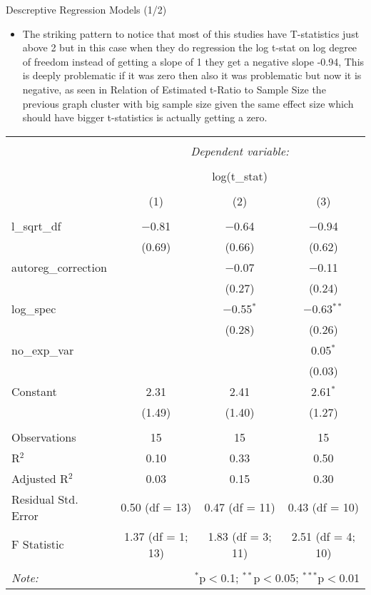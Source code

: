 \documentclass[
  9 pt,
  ignorenonframetext,
]{beamer}
\providecommand{\tightlist}{%
  \setlength{\itemsep}{0pt}\setlength{\parskip}{0pt}}
\begin{document}
\begin{frame}{Descreptive Regression Models (1/2)}
\protect\hypertarget{descreptive-regression-models-12}{}
\begin{itemize}
\tightlist
\item
  The striking pattern to notice that most of this studies have
  T-statistics just above 2 but in this case when they do regression the
  log t-stat on log degree of freedom instead of getting a slope of 1
  they get a negative slope -0.94, This is deeply problematic if it was
  zero then also it was problematic but now it is negative, as seen in
  Relation of Estimated t-Ratio to Sample Size the previous graph
  cluster with big sample size given the same effect size which should
  have bigger t-statistics is actually getting a zero.
\end{itemize}

\begin{table}[!htbp] \centering 

  \label{} 
\footnotesize 
\begin{tabular}{@{\extracolsep{5pt}}lccc} 
\\[-1.8ex]\hline 
\hline \\[-1.8ex] 
 & \multicolumn{3}{c}{\textit{Dependent variable:}} \\ 
\cline{2-4} 
\\[-1.8ex] & \multicolumn{3}{c}{log(t\_stat)} \\ 
\\[-1.8ex] & (1) & (2) & (3)\\ 
\hline \\[-1.8ex] 
 l\_sqrt\_df & $-$0.81 & $-$0.64 & $-$0.94 \\ 
  & (0.69) & (0.66) & (0.62) \\ 
  autoreg\_correction &  & $-$0.07 & $-$0.11 \\ 
  &  & (0.27) & (0.24) \\ 
  log\_spec &  & $-$0.55$^{*}$ & $-$0.63$^{**}$ \\ 
  &  & (0.28) & (0.26) \\ 
  no\_exp\_var &  &  & 0.05$^{*}$ \\ 
  &  &  & (0.03) \\ 
  Constant & 2.31 & 2.41 & 2.61$^{*}$ \\ 
  & (1.49) & (1.40) & (1.27) \\ 
 \hline \\[-1.8ex] 
Observations & 15 & 15 & 15 \\ 
R$^{2}$ & 0.10 & 0.33 & 0.50 \\ 
Adjusted R$^{2}$ & 0.03 & 0.15 & 0.30 \\ 
Residual Std. Error & 0.50 (df = 13) & 0.47 (df = 11) & 0.43 (df = 10) \\ 
F Statistic & 1.37 (df = 1; 13) & 1.83 (df = 3; 11) & 2.51 (df = 4; 10) \\ 
\hline 
\hline \\[-1.8ex] 
\textit{Note:}  & \multicolumn{3}{r}{$^{*}$p$<$0.1; $^{**}$p$<$0.05; $^{***}$p$<$0.01} \\ 
\end{tabular} 
\end{table}
\end{frame}
\end{document}
